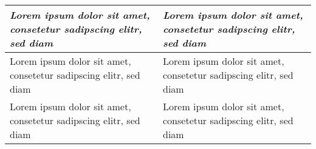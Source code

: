 

\begin{table}[htb]

\ifthenelse{\isundefined{\tabLenA}}{\newlength{\tabLenA\tabLenA}}{}
\ifthenelse{\isundefined{\tabLenB}}{\newlength{\tabLenB\tabLenB}}{}

\setlength{\tabLenA}{0.10\textwidth}
\setlength{\tabLenB}{0.20\textwidth}

\begin{tabularx}{\textwidth}{p{\tabLenA}p{\tabLenB}}
\toprule

\textbf{\textit{Lorem ipsum dolor sit amet, consetetur sadipscing elitr, sed diam}}
&

\textbf{\textit{Lorem ipsum dolor sit amet, consetetur sadipscing elitr, sed diam}}
\\
\toprule

Lorem ipsum dolor sit amet, consetetur sadipscing elitr, sed diam
&

Lorem ipsum dolor sit amet, consetetur sadipscing elitr, sed diam
\\

Lorem ipsum dolor sit amet, consetetur sadipscing elitr, sed diam
&

Lorem ipsum dolor sit amet, consetetur sadipscing elitr, sed diam
\\
\bottomrule
\end{tabularx}
\end{table}
